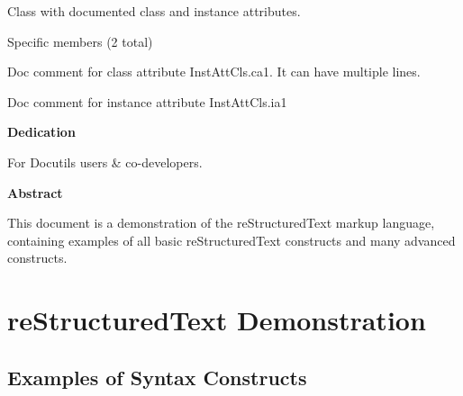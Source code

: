 \documentclass[letterpaper,10pt,english]{sphinxhowto}
\begin{document}

\begin{fulllineitems}
Class with documented class and instance attributes.

Specific members (2 total)

\begin{fulllineitems}
Doc comment for class attribute InstAttCls.ca1.
It can have multiple lines.

\end{fulllineitems}


\begin{fulllineitems}
Doc comment for instance attribute InstAttCls.ia1

\end{fulllineitems}


\end{fulllineitems}

\label{autodoc:module-autodoc_missing_imports}
\begin{SphinxShadowBox}
\textbf{Dedication}

\medskip


For Docutils users \& co-developers.
\end{SphinxShadowBox}

\begin{SphinxShadowBox}
\textbf{Abstract}

\medskip


This document is a demonstration of the reStructuredText markup
language, containing examples of all basic reStructuredText
constructs and many advanced constructs.
\end{SphinxShadowBox}


\section{reStructuredText Demonstration}
\label{metadata:restructuredtext-demonstration}\label{metadata::doc}

\subsection{Examples of Syntax Constructs}
\label{metadata:examples-of-syntax-constructs}
\end{document}

